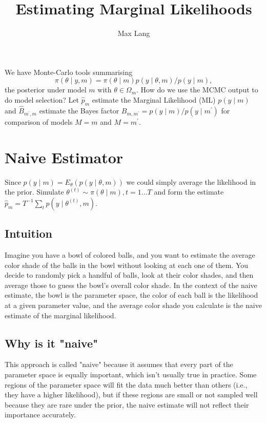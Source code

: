\documentclass{article}
\title{Estimating Marginal Likelihoods}
\author{Max Lang}
\date{}
\begin{document}
\maketitle
We have Monte-Carlo tools summarising
$$
\pi(\theta \mid y, m)=\pi(\theta \mid m) p(y \mid \theta, m) / p(y \mid m),
$$
the posterior under model $m$ with $\theta \in \Omega_m$. How do we use the MCMC output to do model selection? Let $\hat{p}_m$ estimate the Marginal Likelihood (ML) $p(y \mid m)$ and $\hat{B}_{m^{\prime}, m}$ estimate the Bayes factor $B_{m, m^{\prime}}=p(y \mid m) / p\left(y \mid m^{\prime}\right)$ for comparison of models $M=m$ and $M=m^{\prime}$.

\section{Naive Estimator}
Since $p(y \mid m)=E_\theta(p(y \mid \theta, m))$ we could simply average the likelihood in the prior. Simulate $\theta^{(t)} \sim \pi(\theta \mid m), t=1 \ldots T$ and form the estimate $\hat{p}_m=T^{-1} \sum_t p\left(y \mid \theta^{(t)}, m\right)$.

\subsection{Intuition}
Imagine you have a bowl of colored balls, and you want to estimate the average color shade of the balls in the bowl without looking at each one of them. You decide to randomly pick a handful of balls, look at their color shades, and then average those to guess the bowl's overall color shade. In the context of the naive estimate, the bowl is the parameter space, the color of each ball is the likelihood at a given parameter value, and the average color shade you calculate is the naive estimate of the marginal likelihood.

\subsection{Why is it "naive"}
This approach is called "naive" because it assumes that every part of the parameter space is equally important, which isn't usually true in practice. Some regions of the parameter space will fit the data much better than others (i.e., they have a higher likelihood), but if these regions are small or not sampled well because they are rare under the prior, the naive estimate will not reflect their importance accurately.
\end{document}
